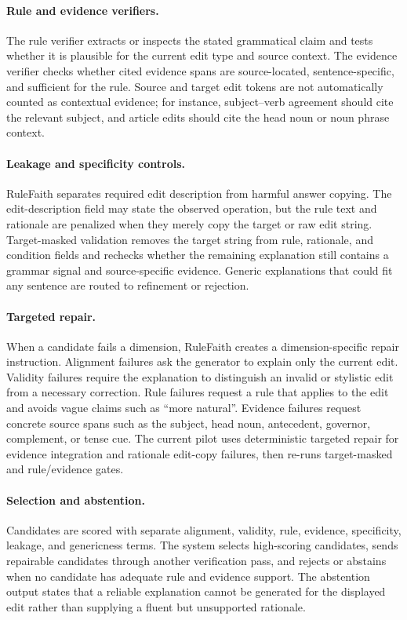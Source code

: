 \paragraph{Rule and evidence verifiers.}
The rule verifier extracts or inspects the stated grammatical claim and tests whether it is plausible for the current edit type and source context. The evidence verifier checks whether cited evidence spans are source-located, sentence-specific, and sufficient for the rule. Source and target edit tokens are not automatically counted as contextual evidence; for instance, subject--verb agreement should cite the relevant subject, and article edits should cite the head noun or noun phrase context.

\paragraph{Leakage and specificity controls.}
RuleFaith separates required edit description from harmful answer copying. The edit-description field may state the observed operation, but the rule text and rationale are penalized when they merely copy the target or raw edit string. Target-masked validation removes the target string from rule, rationale, and condition fields and rechecks whether the remaining explanation still contains a grammar signal and source-specific evidence. Generic explanations that could fit any sentence are routed to refinement or rejection.

\paragraph{Targeted repair.}
When a candidate fails a dimension, RuleFaith creates a dimension-specific repair instruction. Alignment failures ask the generator to explain only the current edit. Validity failures require the explanation to distinguish an invalid or stylistic edit from a necessary correction. Rule failures request a rule that applies to the edit and avoids vague claims such as ``more natural''. Evidence failures request concrete source spans such as the subject, head noun, antecedent, governor, complement, or tense cue. The current pilot uses deterministic targeted repair for evidence integration and rationale edit-copy failures, then re-runs target-masked and rule/evidence gates.

\paragraph{Selection and abstention.}
Candidates are scored with separate alignment, validity, rule, evidence, specificity, leakage, and genericness terms. The system selects high-scoring candidates, sends repairable candidates through another verification pass, and rejects or abstains when no candidate has adequate rule and evidence support. The abstention output states that a reliable explanation cannot be generated for the displayed edit rather than supplying a fluent but unsupported rationale.


